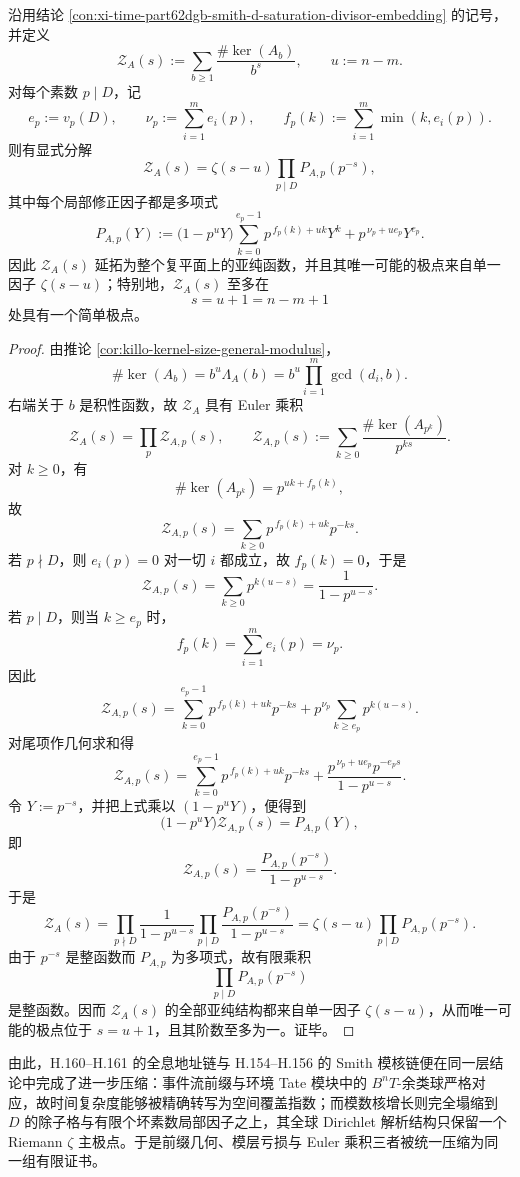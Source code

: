 \begin{conclusion}\label{con:xi-time-part62dgb-kernel-dirichlet-single-zeta-pole}
沿用结论 \ref{con:xi-time-part62dgb-smith-d-saturation-divisor-embedding} 的记号，并定义
\[
\mathcal Z_A(s):=\sum_{b\ge 1}\frac{\#\ker(A_b)}{b^s},
\qquad
u:=n-m.
\]
对每个素数 \(p\mid D\)，记
\[
e_p:=v_p(D),\qquad
\nu_p:=\sum_{i=1}^{m}e_i(p),\qquad
f_p(k):=\sum_{i=1}^{m}\min(k,e_i(p)).
\]
则有显式分解
\[
\mathcal Z_A(s)
=
\zeta(s-u)\prod_{p\mid D}P_{A,p}(p^{-s}),
\]
其中每个局部修正因子都是多项式
\[
P_{A,p}(Y)
:=
\bigl(1-p^uY\bigr)\sum_{k=0}^{e_p-1}p^{\,f_p(k)+uk}Y^k
+p^{\,\nu_p+u e_p}Y^{e_p}.
\]
因此 \(\mathcal Z_A(s)\) 延拓为整个复平面上的亚纯函数，并且其唯一可能的极点来自单一因子 \(\zeta(s-u)\)；特别地，\(\mathcal Z_A(s)\) 至多在
\[
s=u+1=n-m+1
\]
处具有一个简单极点。
\end{conclusion}
\begin{proof}
由推论 \ref{cor:killo-kernel-size-general-modulus}，
\[
\#\ker(A_b)=b^u\Lambda_A(b)
=
b^u\prod_{i=1}^{m}\gcd(d_i,b).
\]
右端关于 \(b\) 是积性函数，故 \(\mathcal Z_A\) 具有 Euler 乘积
\[
\mathcal Z_A(s)=\prod_p \mathcal Z_{A,p}(s),
\qquad
\mathcal Z_{A,p}(s):=\sum_{k\ge 0}\frac{\#\ker(A_{p^k})}{p^{ks}}.
\]
对 \(k\ge 0\)，有
\[
\#\ker(A_{p^k})
=
p^{uk+f_p(k)},
\]
故
\[
\mathcal Z_{A,p}(s)=\sum_{k\ge 0}p^{\,f_p(k)+uk}p^{-ks}.
\]
若 \(p\nmid D\)，则 \(e_i(p)=0\) 对一切 \(i\) 都成立，故 \(f_p(k)=0\)，于是
\[
\mathcal Z_{A,p}(s)=\sum_{k\ge 0}p^{k(u-s)}=\frac{1}{1-p^{u-s}}.
\]
若 \(p\mid D\)，则当 \(k\ge e_p\) 时，
\[
f_p(k)=\sum_{i=1}^{m}e_i(p)=\nu_p.
\]
因此
\[
\mathcal Z_{A,p}(s)
=
\sum_{k=0}^{e_p-1}p^{\,f_p(k)+uk}p^{-ks}
+p^{\nu_p}\sum_{k\ge e_p}p^{k(u-s)}.
\]
对尾项作几何求和得
\[
\mathcal Z_{A,p}(s)
=
\sum_{k=0}^{e_p-1}p^{\,f_p(k)+uk}p^{-ks}
+\frac{p^{\,\nu_p+u e_p}p^{-e_p s}}{1-p^{u-s}}.
\]
令 \(Y:=p^{-s}\)，并把上式乘以 \((1-p^uY)\)，便得到
\[
\bigl(1-p^uY\bigr)\mathcal Z_{A,p}(s)=P_{A,p}(Y),
\]
即
\[
\mathcal Z_{A,p}(s)=\frac{P_{A,p}(p^{-s})}{1-p^{u-s}}.
\]
于是
\[
\mathcal Z_A(s)
=
\prod_{p\nmid D}\frac{1}{1-p^{u-s}}
\prod_{p\mid D}\frac{P_{A,p}(p^{-s})}{1-p^{u-s}}
=
\zeta(s-u)\prod_{p\mid D}P_{A,p}(p^{-s}).
\]
由于 \(p^{-s}\) 是整函数而 \(P_{A,p}\) 为多项式，故有限乘积
\[
\prod_{p\mid D}P_{A,p}(p^{-s})
\]
是整函数。因而 \(\mathcal Z_A(s)\) 的全部亚纯结构都来自单一因子 \(\zeta(s-u)\)，从而唯一可能的极点位于 \(s=u+1\)，且其阶数至多为一。证毕。
\end{proof}

\noindent
由此，H.160--H.161 的全息地址链与 H.154--H.156 的 Smith 模核链便在同一层结论中完成了进一步压缩：事件流前缀与环境 Tate 模块中的 \(B^nT\)-余类球严格对应，故时间复杂度能够被精确转写为空间覆盖指数；而模数核增长则完全塌缩到 \(D\) 的除子格与有限个坏素数局部因子之上，其全球 Dirichlet 解析结构只保留一个 Riemann \(\zeta\) 主极点。于是前缀几何、模层亏损与 Euler 乘积三者被统一压缩为同一组有限证书。

\endinput
